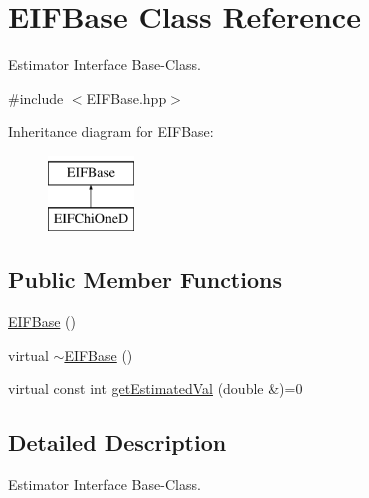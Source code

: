 \hypertarget{classEIFBase}{
\section{EIFBase Class Reference}
\label{df/d13/classEIFBase}
}


Estimator Interface Base-\/Class.  




{\ttfamily \#include $<$EIFBase.hpp$>$}

Inheritance diagram for EIFBase:\begin{figure}[H]
\begin{center}
\leavevmode
\includegraphics[height=2.000000cm]{df/d13/classEIFBase}
\end{center}
\end{figure}
\subsection*{Public Member Functions}
\begin{DoxyCompactItemize}
\item 
\hyperlink{classEIFBase_a8b6ea6ef6b90d40293b55a71249cb5f0}{EIFBase} ()
\item 
virtual \hyperlink{classEIFBase_ae4253811072d1d4251a009bda238f450}{$\sim$EIFBase} ()
\item 
virtual const int \hyperlink{classEIFBase_af98fe883244454497c421bc824b96188}{getEstimatedVal} (double \&)=0
\end{DoxyCompactItemize}


\subsection{Detailed Description}
Estimator Interface Base-\/Class. 

